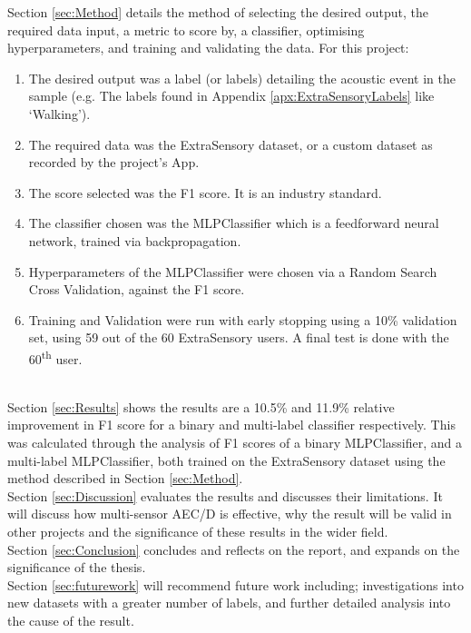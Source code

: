 \documentclass{UoNMCHA}
\newcommand{\sref}[1] {Section \ref{#1}}
\newcommand{\aref}[1] {Appendix \ref{#1}}
\numberwithin{equation}{section}
\begin{document}
\sref{sec:Method} details the method of selecting the desired output, the required data input, a metric to score by, a classifier, optimising hyperparameters, and training and validating the data. For this project:
{\small\begin{enumerate}
    \item The desired output was a label (or labels) detailing the acoustic event in the sample (e.g. The labels found in \aref{apx:ExtraSensoryLabels} like `Walking').
    \item The required data was the ExtraSensory dataset, or a custom dataset as recorded by the project's App.
    \item The score selected was the F1 score. It is an industry standard.
    \item The classifier chosen was the MLPClassifier which is a feedforward neural network, trained via backpropagation.
    \item Hyperparameters of the MLPClassifier were chosen via a Random Search Cross Validation, against the F1 score.
    \item Training and Validation were run with early stopping using a 10\% validation set, using 59 out of the 60 ExtraSensory users. A final test is done with the 60\textsuperscript{th} user.
\end{enumerate} }
~\\
\sref{sec:Results} shows the results are a 10.5\% and 11.9\% relative improvement in F1 score for a binary and multi-label classifier respectively. This was calculated through the analysis of F1 scores of a binary MLPClassifier, and a multi-label MLPClassifier, both trained on the ExtraSensory dataset using the method described in \sref{sec:Method}.\\

\sref{sec:Discussion} evaluates the results and discusses their limitations. It will discuss how multi-sensor AEC/D is effective, why the result will be valid in other projects and the significance of these results in the wider field.\\

\sref{sec:Conclusion} concludes and reflects on the report, and expands on the significance of the thesis.\\

\sref{sec:futurework} will recommend future work including; investigations into new datasets with a greater number of labels, and further detailed analysis into the cause of the result.

\newpage
\vspace{-2mm}
\end{document}
